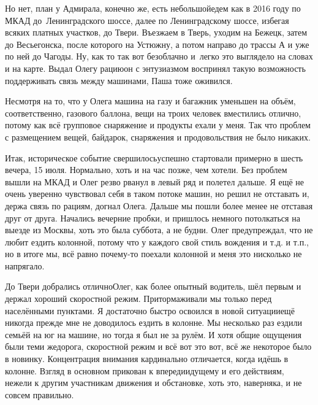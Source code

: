 Но нет, план у Адмирала, конечно же, есть небольшой\mdash едем как в 2016 году по МКАД до~Ленинградского шоссе, далее по Ленинградскому шоссе, избегая всяких платных участков, до Твери. Въезжаем в Тверь, уходим на Бежецк, затем до Весьегонска, после которого на Устюжну, а потом направо до трассы А и уже по ней до Чагоды. Ну, как то так вот безоблачно и~легко это выглядело на словах и на карте. Выдал Олегу рацию\mdash он с энтузиазмом воспринял такую возможность поддерживать связь между машинами, Паша тоже оживился. 

Несмотря на то, что у Олега машина на газу и багажник уменьшен на объём, соответственно, газового баллона, вещи на троих человек вместились отлично, потому как всё групповое снаряжение и продукты ехали у меня. Так что проблем с размещением вещей, байдарок, снаряжения и продовольствия не было никаких.

Итак, историческое событие свершилось\mdash успешно стартовали примерно в шесть вечера, 15 июля. Нормально, хоть и на час позже, чем хотели. Без проблем вышли на МКАД и Олег резво рванул в левый ряд и полетел дальше. Я ещё не очень уверенно чувствовал себя в таком потоке машин, но решил не отставать и, держа связь по рациям, догнал Олега. Дальше мы пошли более менее не отставая друг от друга. Начались вечерние пробки, и пришлось немного потолкаться на выезде из Москвы, хоть это была суббота, а не будни. Олег предупреждал, что не любит ездить колонной, потому что у каждого свой стиль вождения и т.д. и т.п., но в итоге мы, всё равно почему-то поехали колонной и меня это нисколько не напрягало.

До Твери добрались отлично\mdash Олег, как более опытный водитель, шёл первым и держал хороший скоростной режим. Притормаживали мы только перед населёнными пунктами.%
Я достаточно быстро освоился в новой ситуации\mdash ещё никогда прежде мне не доводилось ездить в колонне. Мы несколько раз ездили семьёй на юг на машине, но тогда я был не за рулём. И хотя общие ощущения были теми же\mdash дорога, скоростной режим и всё вот это вот, всё же некоторое было в новинку. Концентрация внимания кардинально отличается, когда идёшь в колонне. Взгляд в основном прикован к впередиидущему и его действиям, нежели к другим участникам движения и обстановке, хоть это, наверняка, и не совсем правильно. 

